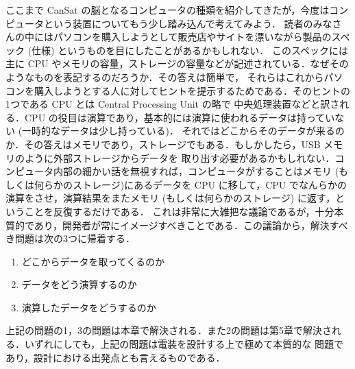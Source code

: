 \documentclass[dvipdfmx]{jsbook}
\begin{document}
  ここまで CanSat の脳となるコンピュータの種類を紹介してきたが，今度はコンピュータという装置についてもう少し踏み込んで考えてみよう．
  読者のみなさんの中にはパソコンを購入しようとして販売店やサイトを漂いながら製品のスペック (仕様) というものを目にしたことがあるかもしれない．
  このスペックには主に CPU やメモリの容量，ストレージの容量などが記述されている．なぜそのようなものを表記するのだろうか．その答えは簡単で，
  それらはこれからパソコンを購入しようとする人に対してヒントを提示するためである．そのヒントの1つである CPU とは Central Processing Unit の略で
  中央処理装置などと訳される．CPU の役目は演算であり，基本的には演算に使われるデータは持っていない (一時的なデータは少し持っている)．
  それではどこからそのデータが来るのか．その答えはメモリであり，ストレージでもある．もしかしたら，USB メモリのように外部ストレージからデータを
  取り出す必要があるかもしれない．コンピュータ内部の細かい話を無視すれば，コンピュータがすることはメモリ (もしくは何らかのストレージ)にあるデータを
  CPU に移して，CPU でなんらかの演算をさせ，演算結果をまたメモリ (もしくは何らかのストレージ) に返す，ということを反復するだけである．
  これは非常に大雑把な議論であるが，十分本質的であり，開発者が常にイメージすべきことである．この議論から，解決すべき問題は次の3つに帰着する．
  \begin{enumerate}
    \item どこからデータを取ってくるのか
    \item データをどう演算するのか
    \item 演算したデータをどうするのか
  \end{enumerate}
  上記の問題の1，3の問題は本章で解決される．また2の問題は第5章で解決される．いずれにしても，上記の問題は電装を設計する上で極めて本質的な
  問題であり，設計における出発点とも言えるものである．
\end{document}
